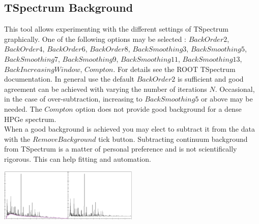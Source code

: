 \documentclass[a4paper,10pt]{article}
\begin{document}
\subsection{TSpectrum Background}
This tool allows experimenting with the different settings of TSpectrum graphically.
One of the following options may be selected : $BackOrder2$, $BackOrder4$, $BackOrder6$, $BackOrder8$, $BackSmoothing3$, $BackSmoothing5$, $BackSmoothing7$, $BackSmoothing9$, $BackSmoothing11$, $BackSmoothing13$, $BackIncreasingWindow$, $Compton$. For details see the ROOT TSpectrum documentation. In general use the default $BackOrder2$ is sufficient and good agreement can be achieved with varying the number of iterations $N$. Occasional, in the case of over-subtraction, increasing to $BackSmoothing5$ or above may be needed. The $Compton$ option does not provide good background for a dense HPGe spectrum.
\\
When a good background is achieved you may elect to subtract it from the data with the $Remove Background$ tick button. Subtracting continuum background from TSpectrum is a matter of personal preference and is not scientifically rigorous. This can help fitting and automation.
\begin{center}
\includegraphics[width=0.5\textwidth]{TSpectrum4.png}
\end{center}
\end{document}
